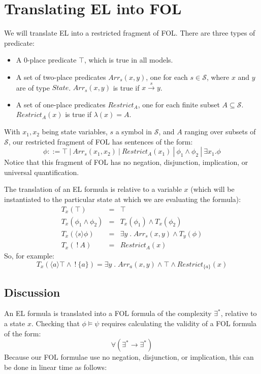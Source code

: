 \documentclass[smallextended]{svjour3}       %
\numberwithin{subcase}{mycase}
\def\fBang {\ ! \ }
\def\fOr {\ | \ }
\begin{document}
\section{Translating EL into FOL}

We will translate EL into a restricted fragment of FOL.
There are three types of predicate:
\begin{itemize}
\item
A 0-place predicate $\top$, which is true in all models.
\item
A set of two-place predicates $Arr_s(x, y)$, one for each $s \in \mathcal{S}$, where $x$ and $y$ are of type $State$. $Arr_s(x, y)$ is true if $x \xrightarrow{s} y$.
\item
A set of one-place predicates $Restrict_A$, one for each finite subset $A \subseteq \mathcal{S}$. 
$Restrict_{A}(x)$ is true if $\lambda(x) = A$.
\end{itemize}
With $x_1, x_2$ being state variables, $s$ a symbol in $\mathcal{S}$, and $A$ ranging over subsets of $\mathcal{S}$, our restricted fragment of FOL has sentences of the form:
\[
\phi ::= \top \fOr Arr_{s}(x_1, x_2)\fOr Restrict_A(x_1) \fOr \phi_1 \land \phi_2 \fOr \exists x_1 . \phi 
\]
Notice that this fragment of FOL has no negation, disjunction, implication, or universal quantification.

The translation of an EL formula is relative to a variable $x$ (which will be instantiated to the particular state at which we are evaluating the formula):
\begin{eqnarray}
T_x(\top) & = & \top \nonumber \\
T_x(\phi_1 \land \phi_2) & = & T_x(\phi_1) \land T_x(\phi_2) \nonumber \\
T_x(\langle s \rangle \phi) & = & \exists y \; . \; Arr_s(x,y) \land T_y(\phi) \nonumber \\
T_x(\fBang A) & = & Restrict_A(x) \nonumber
\end{eqnarray}
So, for example:
\[
T_x(\langle a \rangle \top \land \fBang \{a\}) = \exists y \; . \; Arr_a(x,y) \land \top \land Restrict_{\{a\}}(x)
\]

\subsection{Discussion}
An EL formula is translated into a FOL formula of the complexity $\exists^*$, relative to a state $x$.
Checking that $\phi \models \psi$ requires calculating the validity of a FOL formula of the form:
\[
\forall (\exists^* \rightarrow \exists^*)
\]
Because our FOL formulae use no negation, disjunction, or implication, this can be done in linear time as follows:
\end{document}
